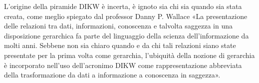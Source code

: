 L'origine della piramide DIKW è incerta, è ignoto sia chi sia quando sia stata creata, come meglio spiegato dal professor Danny P. Wallace\cite{knowledge_management_historical}
«La presentazione delle relazioni tra dati, informazioni, conoscenza e talvolta saggezza in una disposizione gerarchica fa parte del linguaggio della scienza dell'informazione da molti anni. Sebbene non sia chiaro quando e da chi tali relazioni siano state presentate per la prima volta come gerarchia, l'ubiquità della nozione di gerarchia è incorporato nell'uso dell'acronimo DIKW come rappresentazione abbreviata della trasformazione da dati a informazione a conoscenza in saggezza».

